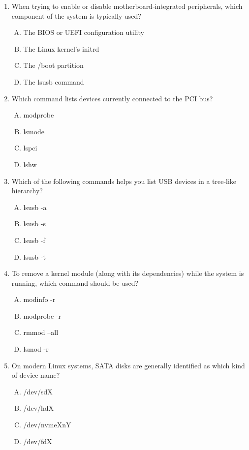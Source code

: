 \documentclass[12pt,a4paper]{report}
\begin{document}
\begin{enumerate}[1.]
\item When trying to enable or disable motherboard-integrated peripherals, which component of the system is typically used?
  \begin{enumerate}[A)]
    \item The BIOS or UEFI configuration utility
    \item The Linux kernel's initrd
    \item The /boot partition
    \item The lsusb command
  \end{enumerate}

\item Which command lists devices currently connected to the PCI bus?
  \begin{enumerate}[A)]
    \item modprobe
    \item lsmode
    \item lspci
    \item lshw
  \end{enumerate}

\item Which of the following commands helps you list USB devices in a tree-like hierarchy?
  \begin{enumerate}[A)]
    \item lsusb -a
    \item lsusb -s
    \item lsusb -f
    \item lsusb -t
  \end{enumerate}

\item To remove a kernel module (along with its dependencies) while the system is running, which command should be used?
  \begin{enumerate}[A)]
    \item modinfo -r
    \item modprobe -r
    \item rmmod --all
    \item lsmod -r
  \end{enumerate}

\item On modern Linux systems, SATA disks are generally identified as which kind of device name?
  \begin{enumerate}[A)]
    \item /dev/sdX
    \item /dev/hdX
    \item /dev/nvmeXnY
    \item /dev/fdX
  \end{enumerate}


\end{enumerate}
\end{document}
